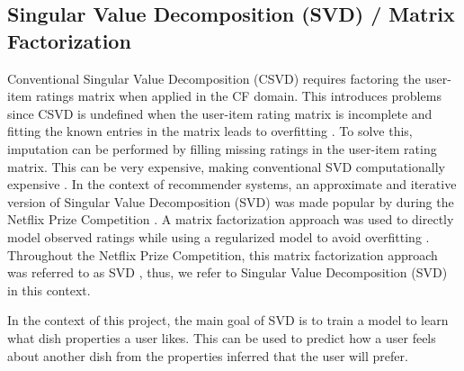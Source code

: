 \subsection{Singular Value Decomposition (SVD) / Matrix Factorization}

Conventional Singular Value Decomposition (CSVD) requires factoring the user-item ratings matrix when applied in the CF domain. This introduces problems since CSVD is undefined when the user-item rating matrix is incomplete and fitting the known entries in the matrix leads to overfitting \cite{koren2009matrix}. To solve this, imputation can be performed by filling missing ratings in the user-item rating matrix. This can be very expensive, making conventional SVD computationally expensive \cite{koren2009matrix}. In the context of recommender systems, an approximate and iterative version of Singular Value Decomposition (SVD) \cite{winnings, netflix_course} was made popular by \citeauthor{simon_funk} \cite{simon_funk} during the Netflix Prize Competition \cite{netflix_course, simon_funk, koren2009matrix}. A matrix factorization \cite{koren2009matrix} approach was used to directly model observed ratings while using a regularized model to avoid overfitting \cite{koren2009matrix}. Throughout the Netflix Prize Competition, this matrix factorization approach was referred to as SVD \cite{netflix_course, winnings}, thus, we refer to Singular Value Decomposition (SVD) in this context. 

In the context of this project, the main goal of SVD is to train a model to learn what dish properties a user likes. This can be used to predict how a user feels about another dish from the properties inferred that the user will prefer. 


